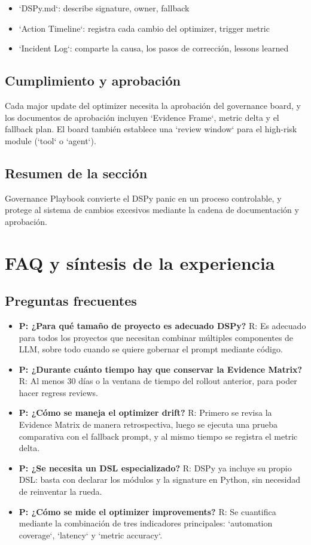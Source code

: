 \documentclass[a4paper]{article}
\begin{document}
\begin{itemize}
    \item `DSPy.md`: describe signature, owner, fallback
    \item `Action Timeline`: registra cada cambio del optimizer, trigger metric
    \item `Incident Log`: comparte la causa, los pasos de corrección, lessons learned
\end{itemize}

\subsection{Cumplimiento y aprobación}

Cada major update del optimizer necesita la aprobación del governance board, y los documentos de aprobación incluyen `Evidence Frame`, metric delta y el fallback plan. El board también establece una `review window` para el high-risk module (`tool` o `agent`).

\subsection{Resumen de la sección}

Governance Playbook convierte el DSPy panic en un proceso controlable, y protege al sistema de cambios excesivos mediante la cadena de documentación y aprobación.

\section{FAQ y síntesis de la experiencia}

\subsection{Preguntas frecuentes}

\begin{itemize}
    \item \textbf{P: ¿Para qué tamaño de proyecto es adecuado DSPy?} R: Es adecuado para todos los proyectos que necesitan combinar múltiples componentes de LLM, sobre todo cuando se quiere gobernar el prompt mediante código.
    \item \textbf{P: ¿Durante cuánto tiempo hay que conservar la Evidence Matrix?} R: Al menos 30 días o la ventana de tiempo del rollout anterior, para poder hacer regress reviews.
    \item \textbf{P: ¿Cómo se maneja el optimizer drift?} R: Primero se revisa la Evidence Matrix de manera retrospectiva, luego se ejecuta una prueba comparativa con el fallback prompt, y al mismo tiempo se registra el metric delta.
    \item \textbf{P: ¿Se necesita un DSL especializado?} R: DSPy ya incluye su propio DSL: basta con declarar los módulos y la signature en Python, sin necesidad de reinventar la rueda.
    \item \textbf{P: ¿Cómo se mide el optimizer improvements?} R: Se cuantifica mediante la combinación de tres indicadores principales: `automation coverage`, `latency` y `metric accuracy`.
\end{itemize}
\end{document}
